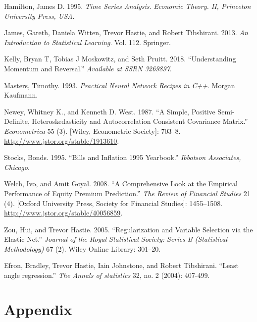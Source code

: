 \documentclass[11pt]{article}
\begin{document}
\leavevmode\hypertarget{ref-hamilton1995time}{}%
Hamilton, James D. 1995. \emph{Time Series Analysis}. \emph{Economic
Theory. II, Princeton University Press, USA}.

\leavevmode\hypertarget{ref-james2013introduction}{}%
James, Gareth, Daniela Witten, Trevor Hastie, and Robert Tibshirani.
2013. \emph{An Introduction to Statistical Learning}. Vol. 112.
Springer.

\leavevmode\hypertarget{ref-kelly2018understanding}{}%
Kelly, Bryan T, Tobias J Moskowitz, and Seth Pruitt. 2018.
``Understanding Momentum and Reversal.'' \emph{Available at SSRN
3269897}.

\leavevmode\hypertarget{ref-masters1993practical}{}%
Masters, Timothy. 1993. \emph{Practical Neural Network Recipes in C++}.
Morgan Kaufmann.

\leavevmode\hypertarget{ref-neweywest1987}{}%
Newey, Whitney K., and Kenneth D. West. 1987. ``A Simple, Positive
Semi-Definite, Heteroskedasticity and Autocorrelation Consistent
Covariance Matrix.'' \emph{Econometrica} 55 (3). {[}Wiley, Econometric
Society{]}: 703--8. \url{http://www.jstor.org/stable/1913610}.

\leavevmode\hypertarget{ref-stocks1995bills}{}%
Stocks, Bonds. 1995. ``Bills and Inflation 1995 Yearbook.''
\emph{Ibbotson Associates, Chicago}.

\leavevmode\hypertarget{ref-goyalwelch2008}{}%
Welch, Ivo, and Amit Goyal. 2008. ``A Comprehensive Look at the
Empirical Performance of Equity Premium Prediction.'' \emph{The Review
of Financial Studies} 21 (4). {[}Oxford University Press, Society for
Financial Studies{]}: 1455--1508.
\url{http://www.jstor.org/stable/40056859}.

\leavevmode\hypertarget{ref-zou2005regularization}{}%
Zou, Hui, and Trevor Hastie. 2005. ``Regularization and Variable
Selection via the Elastic Net.'' \emph{Journal of the Royal Statistical
Society: Series B (Statistical Methodology)} 67 (2). Wiley Online
Library: 301--20.

\leavevmode\hypertarget{ref-zou2005regularization}{}%
Efron, Bradley, Trevor Hastie, Iain Johnstone, and Robert Tibshirani. ``Least angle regression.'' \emph{The Annals of statistics} 32, no. 2 (2004): 407-499.

\newpage

\hypertarget{appendix}{%
\section{Appendix}\label{appendix}}
\end{document}
